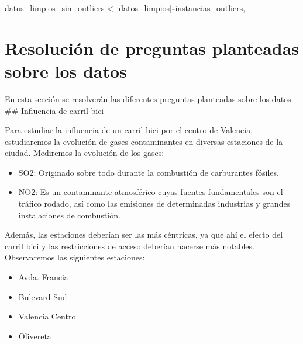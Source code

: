 \documentclass[notspecified,article,submit,moreauthors,pdftex]{Definitions/mdpi}
\newenvironment{Shaded}{\begin{snugshade}}{\end{snugshade}}
\newcommand{\NormalTok}[1]{#1}
\newcommand{\OtherTok}[1]{\textcolor[rgb]{0.56,0.35,0.01}{#1}}
\newcommand{\SpecialCharTok}[1]{\textcolor[rgb]{0.81,0.36,0.00}{\textbf{#1}}}
\providecommand{\tightlist}{%
  \setlength{\itemsep}{0pt}\setlength{\parskip}{0pt}}
\begin{document}
\begin{Shaded}
\begin{Highlighting}[]
\NormalTok{datos\_limpios\_sin\_outliers }\OtherTok{\textless{}{-}}\NormalTok{ datos\_limpios[}\SpecialCharTok{{-}}\NormalTok{instancias\_outliers, ]}
\end{Highlighting}
\end{Shaded}

\hypertarget{resoluciuxf3n-de-preguntas-planteadas-sobre-los-datos}{%
\section{Resolución de preguntas planteadas sobre los
datos}\label{resoluciuxf3n-de-preguntas-planteadas-sobre-los-datos}}

En esta sección se resolverán las diferentes preguntas planteadas sobre
los datos. \#\# Influencia de carril bici

Para estudiar la influencia de un carril bici por el centro de Valencia,
estudiaremos la evolución de gases contaminantes en diversas estaciones
de la ciudad. Mediremos la evolución de los gases:

\begin{itemize}
\tightlist
\item
  SO2: Originado sobre todo durante la combustión de carburantes
  fósiles.
\item
  NO2: Es un contaminante atmosférico cuyas fuentes fundamentales son el
  tráfico rodado, así como las emisiones de determinadas industrias y
  grandes instalaciones de combustión.
\end{itemize}

Además, las estaciones deberían ser las más céntricas, ya que ahí el
efecto del carril bici y las restricciones de acceso deberían hacerse
más notables. Observaremos las siguientes estaciones:

\begin{itemize}
\tightlist
\item
  Avda. Francia
\item
  Bulevard Sud
\item
  Valencia Centro
\item
  Olivereta
\end{itemize}
\end{document}
